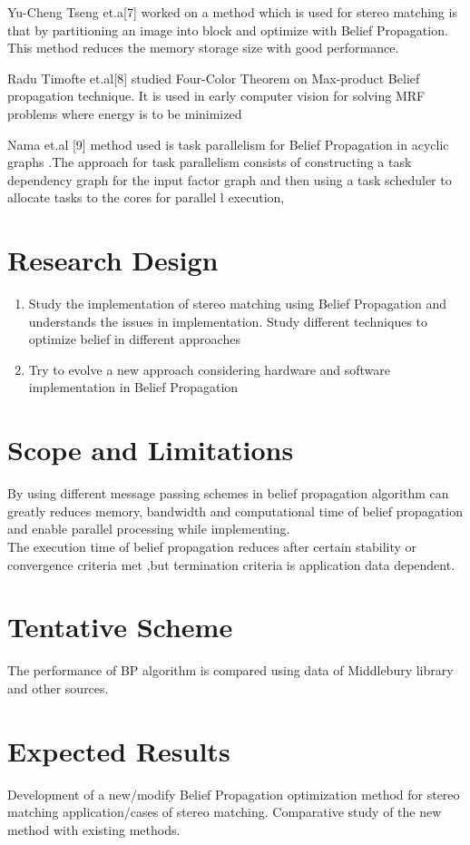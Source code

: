 Yu-Cheng Tseng et.a[7]  worked on  a method which is  used  for stereo matching is that by partitioning an image into block and optimize with Belief Propagation. This method reduces the memory storage size with good performance.





Radu  Timofte et.al[8] studied Four-Color Theorem  on Max-product Belief propagation technique. It is used in early computer vision for solving MRF problems where energy is to be minimized

Nama et.al [9]  method used is task parallelism for Belief Propagation in acyclic graphs .The approach for task parallelism consists of constructing a task dependency graph for the input factor graph and then using a task scheduler to allocate tasks to the cores for parallel l execution,


\section{\textbf{Research Design}}

\begin{enumerate}
\item Study the implementation of stereo matching using Belief Propagation and understands the issues in implementation. Study different techniques to optimize belief in different approaches
\item  Try to evolve a new approach considering hardware and software implementation in Belief Propagation
\end{enumerate}
\section{\textbf{Scope and Limitations}} By using different message passing schemes in belief propagation algorithm can greatly reduces memory, bandwidth and computational time of belief propagation and enable parallel processing while implementing.\\
The execution time of belief propagation reduces after certain stability or convergence criteria met ,but termination criteria is application data dependent.
\section{\textbf{Tentative Scheme }}The performance of BP algorithm is compared  using data of  Middlebury library and other sources.
\section{Expected Results} Development of a new/modify Belief Propagation optimization method for stereo matching application/cases of stereo matching. Comparative study of the new method with existing methods. 